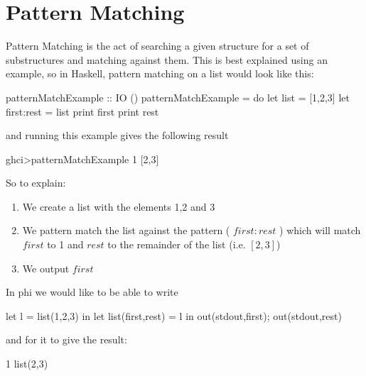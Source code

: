\section{Pattern Matching}
\label{sec:patterns}
Pattern Matching is the act of searching a given structure for a set of substructures and matching against them. This is best explained using an example, so in Haskell, pattern matching on a list would look like this:

\label{example:pmatchhask}
\begin{code}
patternMatchExample :: IO ()
patternMatchExample = do
        let list = [1,2,3]
        let first:rest = list
        print first
        print rest
\end{code}
and running this example gives the following result
\begin{code}
    ghci>patternMatchExample 
    1
    [2,3]
\end{code}

So to explain:
\begin{enumerate}
    \item We create a list with the elements 1,2 and 3
    \item We pattern match the list against the pattern ( $first:rest$ ) which will match $first$ to 1 and $rest$ to the remainder of the list (i.e. $[2,3]$)
    \item We output $first$
\end{enumerate}

In phi we would like to be able to write

\begin{code}
let l = list(1,2,3) in
    let list(first,rest) = l in
        out(stdout,first);
        out(stdout,rest)
\end{code}

and for it to give the result:

\begin{code}
    1
    list(2,3)
\end{code}

